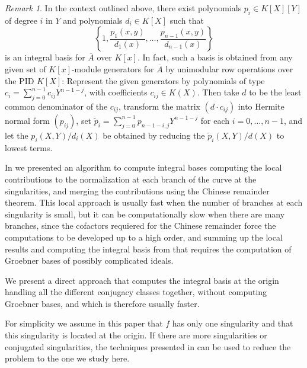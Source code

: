 \documentclass[a4paper,11pt]{amsart}%
\theoremstyle{definition}
\theoremstyle{plain}
\theoremstyle{remark}
\newtheorem{remark}[defn]{Remark}
\begin{document}
\begin{remark}
\label{rem:spec-int-basis}
In the context outlined above, there exist
polynomials $p_{i} \in K[X][Y]$ of degree $i$ in $Y$ and polynomials
$d_i\in K[X]$ such that
\[
\left\{1,\frac{p_{1}(x,y)}{d_1(x)},\dots,\frac{p_{n-1}(x,y)}{d_{n-1}(x)}\right\}
\]
is an integral basis %
 for $\overline{A}$ over $K[x]$. In fact, such a
basis is obtained from any given set of
$K[x]$-module generators for $\overline{A}$ by unimodular row operations over
the PID $K[X]$: Represent the given generators by polynomials of type
$c_{i}=\sum_{j=0}^{n-1}c_{ij}Y^{n-1-j}$, with coefficients $c_{ij}\in K(X)$.
Then take $d$ to be the least common denominator of the $c_{ij}$,
transform the matrix $(d\cdot c_{ij})$ into Hermite normal form $(p_{ij})$,
set $\widetilde{p}_{i}=\sum_{j=0}^{n-1}p_{n-1-i ,j}Y^{n-1-j}$ for each $i=0,\dots, n-1$,
and let the ${p}_{i}(X,Y)/d_i(X)$ be obtained by reducing the
$\widetilde{p}_{i}(X,Y)/d(X)$ to lowest terms.
\end{remark}

In \cite{intbas} we presented an algorithm to compute integral bases computing the local contributions to the normalization at each branch of the curve at the singularities, and merging the contributions using the Chinese remainder theorem. This local approach is usually fast when the number of branches at each singularity is small, but it can be computationally
slow when there are many branches, since the cofactors requiered for the Chinese remainder force the computations to be developed up to a high order, and summing up the local results and computing the integral basis from that requires the computation of Groebner bases of possibly complicated ideals.

We present a direct approach that computes the integral basis at the origin
handling all the different conjugacy classes together, without computing
Groebner bases, and which is therefore usually faster.

For simplicity we assume in this paper that $f$ has only one singularity and that this singularity is located at the origin.
If there are more singularities or conjugated singularities, the techniques presented in \cite{intbas} can be used to reduce the problem to the one we study here.
\end{document}
